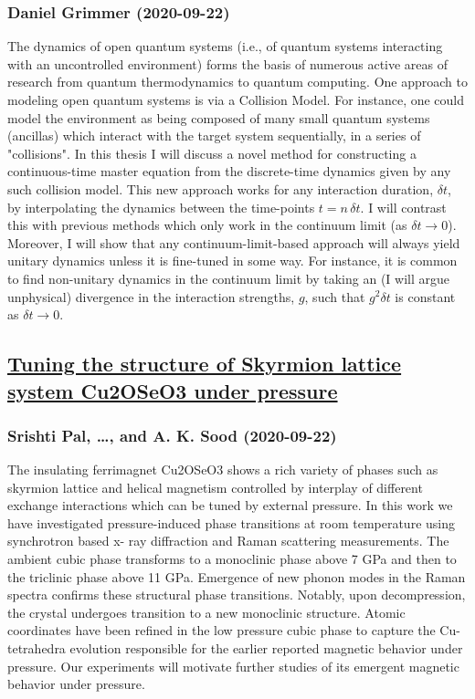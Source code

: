 {\subsubsection*{Daniel Grimmer (2020-09-22)}
The dynamics of open quantum systems (i.e., of quantum systems interacting
with an uncontrolled environment) forms the basis of numerous active areas of
research from quantum thermodynamics to quantum computing. One approach to
modeling open quantum systems is via a Collision Model. For instance, one could
model the environment as being composed of many small quantum systems
(ancillas) which interact with the target system sequentially, in a series of
"collisions". In this thesis I will discuss a novel method for constructing a
continuous-time master equation from the discrete-time dynamics given by any
such collision model. This new approach works for any interaction duration,
$\delta t$, by interpolating the dynamics between the time-points $t =
n\,\delta t$. I will contrast this with previous methods which only work in the
continuum limit (as $\delta t\to 0$). Moreover, I will show that any
continuum-limit-based approach will always yield unitary dynamics unless it is
fine-tuned in some way. For instance, it is common to find non-unitary dynamics
in the continuum limit by taking an (I will argue unphysical) divergence in the
interaction strengths, $g$, such that $g^2 \delta t$ is constant as $\delta t
\to 0$.

\subsection*{\href{http://arxiv.org/abs/2009.10469v1}{Tuning the structure of Skyrmion lattice system Cu2OSeO3 under pressure}}
\subsubsection*{Srishti Pal, \dots, and A. K. Sood (2020-09-22)}
The insulating ferrimagnet Cu2OSeO3 shows a rich variety of phases such as
skyrmion lattice and helical magnetism controlled by interplay of different
exchange interactions which can be tuned by external pressure. In this work we
have investigated pressure-induced phase transitions at room temperature using
synchrotron based x- ray diffraction and Raman scattering measurements. The
ambient cubic phase transforms to a monoclinic phase above 7 GPa and then to
the triclinic phase above 11 GPa. Emergence of new phonon modes in the Raman
spectra confirms these structural phase transitions. Notably, upon
decompression, the crystal undergoes transition to a new monoclinic structure.
Atomic coordinates have been refined in the low pressure cubic phase to capture
the Cu-tetrahedra evolution responsible for the earlier reported magnetic
behavior under pressure. Our experiments will motivate further studies of its
emergent magnetic behavior under pressure.

}
